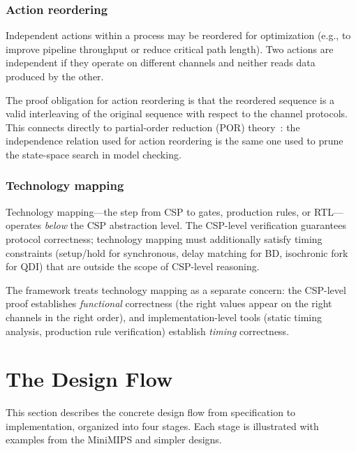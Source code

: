 \documentclass[11pt]{article}
\begin{document}
\subsubsection{Action reordering}

Independent actions within a process may be reordered for optimization
(e.g., to improve pipeline throughput or reduce critical path length).
Two actions are independent if they operate on different channels and
neither reads data produced by the other.

The proof obligation for action reordering is that the reordered
sequence is a valid interleaving of the original sequence with respect
to the channel protocols.  This connects directly to partial-order
reduction (POR) theory~\cite{peled1993}: the independence relation
used for action reordering is the same one used to prune the
state-space search in model checking.

\subsubsection{Technology mapping}

Technology mapping---the step from CSP to gates, production rules, or
RTL---operates \emph{below} the CSP abstraction level.  The CSP-level
verification guarantees protocol correctness; technology mapping must
additionally satisfy timing constraints (setup/hold for synchronous,
delay matching for BD, isochronic fork for QDI) that are outside the
scope of CSP-level reasoning.

The framework treats technology mapping as a separate concern:
the CSP-level proof establishes \emph{functional} correctness (the
right values appear on the right channels in the right order), and
implementation-level tools (static timing analysis, production rule
verification) establish \emph{timing} correctness.

\section{The Design Flow}
\label{sec:flow}

This section describes the concrete design flow from specification to
implementation, organized into four stages.  Each stage is illustrated
with examples from the MiniMIPS and simpler designs.

\end{document}
